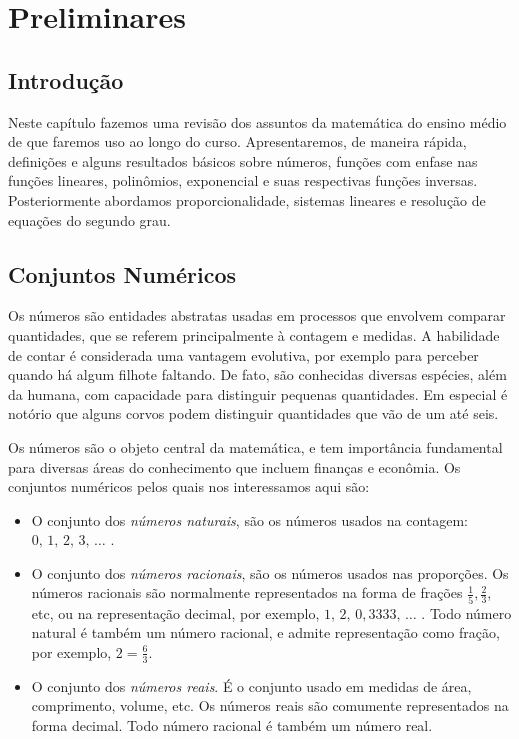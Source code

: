 \chapter{Preliminares}
\thispagestyle{empty}

\section{Introdução}


Neste capítulo fazemos uma revisão dos assuntos da matemática do ensino médio de que faremos uso ao longo do curso.
Apresentaremos, de maneira rápida, definições e alguns resultados básicos sobre números, funções com enfase nas funções lineares,
polinômios, exponencial e suas respectivas funções inversas. Posteriormente abordamos proporcionalidade,
 sistemas lineares e resolução de equações do segundo grau.

\section{Conjuntos Numéricos}

Os números são entidades abstratas usadas em processos que envolvem comparar quantidades, que se referem principalmente à contagem e medidas.
A habilidade de contar é considerada uma vantagem evolutiva, por exemplo para perceber quando há algum filhote faltando. De fato, são conhecidas diversas espécies,
além da humana,
com capacidade para distinguir pequenas quantidades. Em especial é notório que alguns corvos podem distinguir quantidades que vão de um até seis.

Os números são o objeto central da matemática, e tem importância fundamental para diversas áreas do conhecimento que incluem finanças e econômia. Os conjuntos numéricos pelos quais nos interessamos aqui são:
\begin{itemize}
\item[$\N$:] O conjunto dos \textit{números naturais}, são os números usados na contagem: $0,\,1,\,2,\,3,\,\ldots$ .
\item[$\Q$:] O conjunto dos \textit{números racionais}, são os números usados nas proporções. Os números
racionais são normalmente representados na forma de frações $\frac{1}{5}, \frac{2}{3}$, etc, ou na representação
decimal, por exemplo, $1,\,2,\,0,3333,\,\ldots$ . Todo número natural é também um número racional,
e admite representação como fração, por exemplo, $2=\frac{6}{3}$.
\item[$\R$:] O conjunto dos \textit{números reais}. É o conjunto usado em medidas de área,
comprimento, volume, etc. Os números reais são comumente representados na forma decimal.
Todo número racional é também um número real.
\end{itemize}

